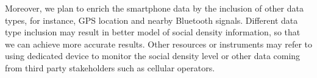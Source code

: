Moreover, we plan to enrich the smartphone data by the inclusion of other data types, for instance, \ac{GPS} location and nearby Bluetooth signals. Different data type inclusion may result in better model of social density information, so that we can achieve more accurate results. Other resources or instruments may refer to using dedicated device to monitor the social density level or other data coming from third party stakeholders such as cellular operators.

